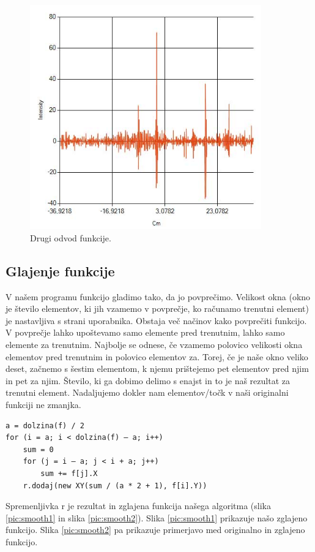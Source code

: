 \documentclass[oneside, a4paper, 12pt]{book}
\begin{document}
\begin{figure}
\begin{center}
\includegraphics[width=10cm]{slike/drugi-odvod-1.jpg}
\end{center}
\caption{Drugi odvod funkcije.}
\label{pic:d2}
\end{figure}

\subsection{Glajenje funkcije}
V našem programu funkcijo gladimo tako, da jo povprečimo. Velikost okna (okno je število elementov, ki jih vzamemo v povprečje, ko računamo trenutni element) je nastavljiva s strani uporabnika. Obstaja več načinov kako povprečiti funkcijo. V povprečje lahko upoštevamo samo elemente pred trenutnim, lahko samo elemente za trenutnim. Najbolje se odnese, če vzamemo polovico velikosti okna elementov pred trenutnim in polovico elementov za. Torej, če je naše okno veliko deset, začnemo s šestim elementom, k njemu prištejemo pet elementov pred njim in pet za njim. Število, ki ga dobimo delimo s enajst in to je naš rezultat za trenutni element. Nadaljujemo dokler nam elementov/točk v naši originalni funkciji ne zmanjka. 

\begin{verbatim}
a = dolzina(f) / 2
for (i = a; i < dolzina(f) – a; i++)
    sum = 0
    for (j = i – a; j < i + a; j++)
        sum += f[j].X
    r.dodaj(new XY(sum / (a * 2 + 1), f[i].Y))
\end{verbatim}

Spremenljivka r je rezultat in zglajena funkcija našega algoritma (slika \ref{pic:smooth1} in slika \ref{pic:smooth2}).
Slika \ref{pic:smooth1} prikazuje našo zglajeno funkcijo. Slika \ref{pic:smooth2} pa prikazuje primerjavo med originalno in zglajeno funkcijo.
\end{document}
